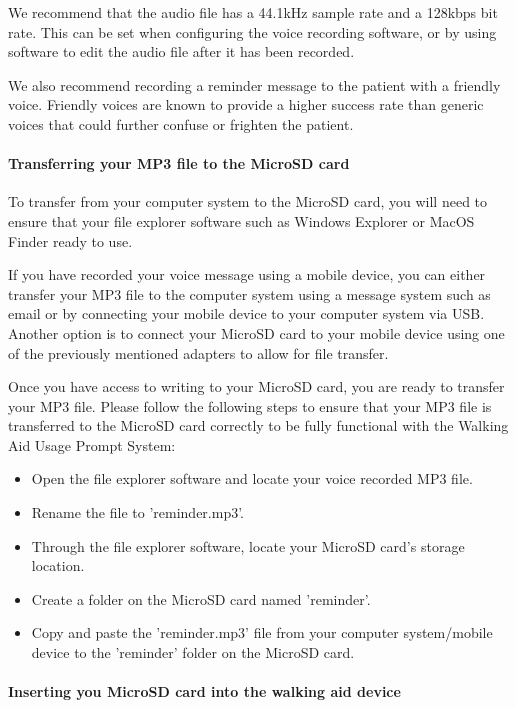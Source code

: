 				We recommend that the audio file has a 44.1kHz sample rate and a 128kbps bit rate. This can be set when configuring the voice recording software, or by using software to edit the audio file after it has been recorded.

				We also recommend recording a reminder message to the patient with a friendly voice. Friendly voices are known to provide a higher success rate than generic voices that could further confuse or frighten the patient.

				\paragraph{Transferring your MP3 file to the MicroSD card}\mbox{}

				To transfer from your computer system to the MicroSD card, you will need to ensure that your file explorer software such as Windows Explorer or MacOS Finder ready to use.

				If you have recorded your voice message using a mobile device, you can either transfer your MP3 file to the computer system using a message system such as email or by connecting your mobile device to your computer system via USB. Another option is to connect your MicroSD card to your mobile device using one of the previously mentioned adapters to allow for file transfer.

				Once you have access to writing to your MicroSD card, you are ready to transfer your MP3 file. Please follow the following steps to ensure that your MP3 file is transferred to the MicroSD card correctly to be fully functional with the Walking Aid Usage Prompt System:

				\begin{itemize}
					\item Open the file explorer software and locate your voice recorded MP3 file.
					\item Rename the file to 'reminder.mp3'.
					\item Through the file explorer software, locate your MicroSD card's storage location.
					\item Create a folder on the MicroSD card named 'reminder'.
					\item Copy and paste the 'reminder.mp3' file from your computer system/mobile device to the 'reminder' folder on the MicroSD card.
				\end{itemize}

				\paragraph{Inserting you MicroSD card into the walking aid device}\mbox{}

